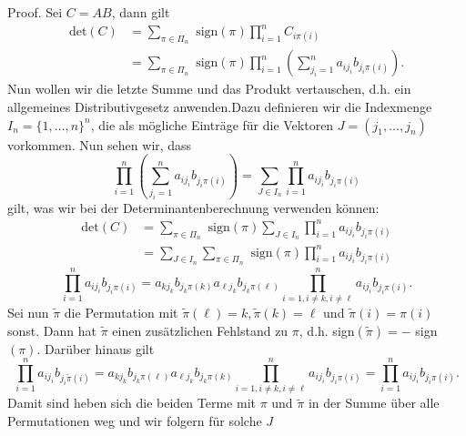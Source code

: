 \documentclass[letterpaper,10pt,english]{jupyterBook}
\begin{document}
\begin{emphBox}{}{}
Proof.  Sei \(C=AB\), dann gilt
\begin{align*}
\text{det}(C) &= \sum_{\pi \in \Pi_n} \text{ sign}(\pi) \prod_{i=1}^n C_{i\pi(i)} \\
&= \sum_{\pi \in \Pi_n} \text{ sign}(\pi) \prod_{i=1}^n ( \sum_{j_i=1}^n a_{ij_i} b_{j_i\pi(i)})  .
\end{align*}
Nun wollen wir die letzte Summe und das Produkt vertauschen, d.h. ein allgemeines Distributivgesetz anwenden.Dazu definieren wir die Indexmenge \( I_n = \{1,\ldots,n\}^n\), die als mögliche Einträge für die Vektoren \(J=(j_1,\ldots,j_n)\) vorkommen. Nun sehen wir, dass
\begin{equation*}
 \prod_{i=1}^n ( \sum_{j_i=1}^n a_{ij_i} b_{j_i\pi(i)}) = \sum_{J \in I_n} \prod_{i=1}^n  a_{ij_i} b_{j_i\pi(i)}
\end{equation*}
gilt, was wir bei der Determinantenberechnung verwenden können:
\begin{align*} \text{det}(C) &= \sum_{\pi \in \Pi_n} \text{ sign}(\pi) \sum_{J \in I_n} \prod_{i=1}^n  a_{ij_i} b_{j_i\pi(i)}  \\ &= \sum_{J \in I_n}  \sum_{\pi \in \Pi_n} \text{ sign}(\pi)\prod_{i=1}^n  a_{ij_i} b_{j_i\pi(i)}\end{align*}\begin{equation*}
 \prod_{i=1}^n  a_{ij_i} b_{j_i\pi(i)} = a_{kj_k} b_{j_k\pi(k)} a_{\ell j_k} b_{j_k\pi(\ell)} \prod_{i=1, i \neq k, i \neq \ell}^n  a_{ij_i} b_{j_i\pi(i)}.\end{equation*}
Sei nun \(\tilde \pi\) die Permutation mit \(\tilde \pi(\ell)=k, \tilde \pi(k) = \ell\) und \(\tilde \pi(i)=\pi(i)\) sonst. Dann hat \(\tilde \pi\) einen zusätzlichen Fehlstand zu \(\pi\), d.h. sign\((\tilde \pi)= - \) sign\((\pi)\). Darüber hinaus gilt
\begin{equation*}
 \prod_{i=1}^n  a_{ij_i} b_{j_i\tilde \pi(i)} = a_{kj_k} b_{j_k\pi(\ell)} a_{\ell j_k} b_{j_k\pi(k)} \prod_{i=1, i \neq k, i \neq \ell}^n  a_{ij_i} b_{j_i\pi(i)} = \prod_{i=1}^n  a_{ij_i} b_{j_i\pi(i)} .\end{equation*}
Damit sind heben sich die beiden Terme mit \(\pi\) und \(\tilde \pi\) in der Summe über alle Permutationen weg und wir folgern für solche \(J\)
\begin{equation*}

\end{equation*}
\end{emphBox}
\end{document}
